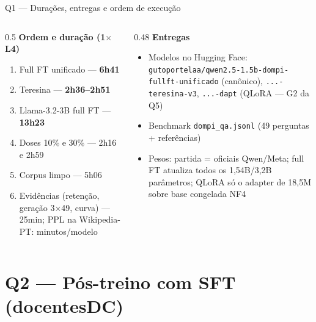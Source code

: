 \documentclass[10pt,aspectratio=169]{beamer}
\begin{document}
\begin{frame}{Q1 — Durações, entregas e ordem de execução}
  \begin{columns}[T]
    \begin{column}{0.5\textwidth}
      \textbf{Ordem e duração (1$\times$ L4)}
      \begin{enumerate}\small
        \item Full FT unificado — \textbf{6h41}
        \item Teresina — \textbf{2h36–2h51}
        \item Llama-3.2-3B full FT — \textbf{13h23}
        \item Doses 10\% e 30\% — 2h16 e 2h59
        \item Corpus limpo — 5h06
        \item Evidências (retenção, geração 3$\times$49, curva) — 25min; PPL na Wikipedia-PT: minutos/modelo
      \end{enumerate}
    \end{column}
    \begin{column}{0.48\textwidth}
      \textbf{Entregas}
      \begin{itemize}\small
        \item Modelos no Hugging Face: \texttt{gutoportelaa/qwen2.5-1.5b-dompi-fullft-unificado} (canônico), \texttt{...-teresina-v3}, \texttt{...-dapt} (QLoRA — G2 da Q5)
        \item Benchmark \texttt{dompi\_qa.jsonl} (49 perguntas + referências)
        \item Pesos: partida = oficiais Qwen/Meta; full FT atualiza todos os 1,54B/3,2B parâmetros; QLoRA só o adapter de 18,5M sobre base congelada NF4
      \end{itemize}
    \end{column}
  \end{columns}
\end{frame}

\section{Q2 — Pós-treino com SFT (docentesDC)}
\end{document}
